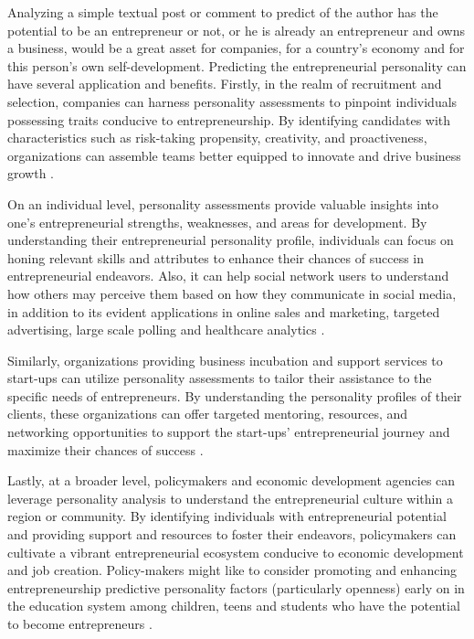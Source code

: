 Analyzing a simple textual post or comment to predict of the author has the potential to be an entrepreneur or not, or he is already an entrepreneur and owns a business, would be a great asset for companies, for a country's economy and for this person's own self-development. Predicting the entrepreneurial personality can have several application and benefits. Firstly, in the realm of recruitment and selection, companies can harness personality assessments to pinpoint individuals possessing traits conducive to entrepreneurship. By identifying candidates with characteristics such as risk-taking propensity, creativity, and proactiveness, organizations can assemble teams better equipped to innovate and drive business growth \cite{el2022deep}. 

On an individual level, personality assessments provide valuable insights into one's entrepreneurial strengths, weaknesses, and areas for development. By understanding their entrepreneurial personality profile, individuals can focus on honing relevant skills and attributes to enhance their chances of success in entrepreneurial endeavors. Also, it can help social network users to understand how others may perceive them based on how they communicate in social media, in addition to its evident applications in online sales and marketing, targeted advertising, large scale polling and healthcare analytics \cite{volkova2015inferring}.

Similarly, organizations providing business incubation and support services to start-ups can utilize personality assessments to tailor their assistance to the specific needs of entrepreneurs. By understanding the personality profiles of their clients, these organizations can offer targeted mentoring, resources, and networking opportunities to support the start-ups' entrepreneurial journey and maximize their chances of success \cite{antoncic2015big}.

Lastly, at a broader level, policymakers and economic development agencies can leverage personality analysis to understand the entrepreneurial culture within a region or community. By identifying individuals with entrepreneurial potential and providing support and resources to foster their endeavors, policymakers can cultivate a vibrant entrepreneurial ecosystem conducive to economic development and job creation. Policy-makers might like to consider promoting and enhancing entrepreneurship predictive personality factors (particularly openness) early on in the education system among children, teens and students who have the potential to become entrepreneurs \cite{antoncic2015big}.




%